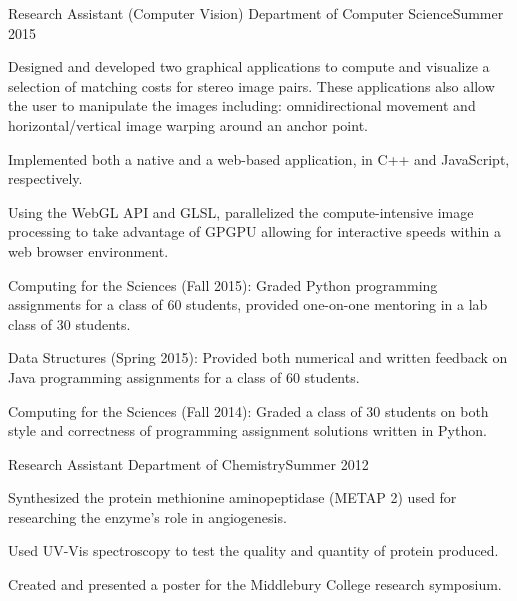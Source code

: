 \documentclass[10pt]{resume}
\begin{document}
\expblock
{Research Assistant (Computer Vision) \textnormal{Department of Computer Science}}{Summer 2015} 
{ 
    \item Designed and developed two graphical applications to compute and
    visualize a selection of matching costs for stereo image pairs. These
    applications also allow the user to manipulate the images including:
    omnidirectional movement and horizontal/vertical image warping around
    an anchor point.

    \item Implemented both a native and a web-based application, in C++ and
    JavaScript, respectively.

    \item Using the WebGL API and GLSL, parallelized the compute-intensive
    image processing to take advantage of GPGPU allowing for interactive
    speeds within a web browser environment.
}

{
    
    \item Computing for the Sciences (Fall 2015): Graded Python
    programming assignments for a class of 60 students, provided one-on-one
    mentoring in a lab class of 30 students.

    \item Data Structures (Spring 2015): Provided both numerical and
    written feedback on Java programming assignments for a class of 60
    students.

    \item Computing for the Sciences (Fall 2014): Graded a class of 30
    students on both style and correctness of programming assignment solutions
    written in Python. 
}

\expblock
{Research Assistant \textnormal{Department of Chemistry}}{Summer 2012}
{
    \item Synthesized the protein methionine aminopeptidase (METAP 2) used for
    researching the enzyme's role in angiogenesis.

    \item Used UV-Vis spectroscopy to test the quality and quantity of protein
    produced. 
    

    \item Created and presented a poster for the Middlebury College research
    symposium. 
}
\end{document}
